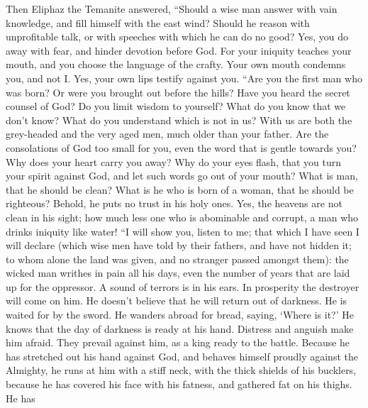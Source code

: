  Then Eliphaz the Temanite answered, 
``Should a wise man answer with vain knowledge, and fill himself with
the east wind?  Should he reason with unprofitable talk,
or with speeches with which he can do no good?  Yes, you
do away with fear, and hinder devotion before God.  For
your iniquity teaches your mouth, and you choose the language of the
crafty.  Your own mouth condemns you, and not I. Yes, your
own lips testify against you.  ``Are you the first man who
was born? Or were you brought out before the hills?  Have
you heard the secret counsel of God? Do you limit wisdom to yourself?
 What do you know that we don't know? What do you
understand which is not in us?  With us are both the
grey-headed and the very aged men, much older than your father.
 Are the consolations of God too small for you, even the
word that is gentle towards you?  Why does your heart
carry you away? Why do your eyes flash,  that you turn
your spirit against God, and let such words go out of your mouth?
 What is man, that he should be clean? What is he who is
born of a woman, that he should be righteous?  Behold, he
puts no trust in his holy ones. Yes, the heavens are not clean in his
sight;  how much less one who is abominable and corrupt,
a man who drinks iniquity like water!  ``I will show you,
listen to me; that which I have seen I will declare 
(which wise men have told by their fathers, and have not hidden it;
 to whom alone the land was given, and no stranger passed
amongst them):  the wicked man writhes in pain all his
days, even the number of years that are laid up for the oppressor.
 A sound of terrors is in his ears. In prosperity the
destroyer will come on him.  He doesn't believe that he
will return out of darkness. He is waited for by the sword.
 He wanders abroad for bread, saying, `Where is it?' He
knows that the day of darkness is ready at his hand. 
Distress and anguish make him afraid. They prevail against him, as a
king ready to the battle.  Because he has stretched out
his hand against God, and behaves himself proudly against the Almighty,
 he runs at him with a stiff neck, with the thick shields
of his bucklers,  because he has covered his face with
his fatness, and gathered fat on his thighs.  He has
